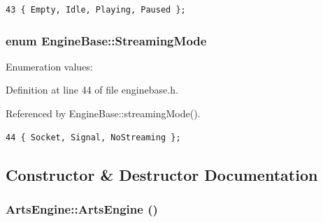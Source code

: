 \footnotesize\begin{verbatim}43 { Empty, Idle, Playing, Paused };
\end{verbatim}\normalsize 
{}
\subsubsection{\setlength{\rightskip}{0pt plus 5cm}enum {\bf Engine\-Base::Streaming\-Mode}\hspace{0.3cm}{\tt  [inherited]}}\label{classEngineBase_EngineBasew8}


\begin{Desc}
\item[Enumeration values: ]\par
\begin{description}
\item[{\em 
Socket\label{classEngineBase_EngineBasew8EngineBasew4}
}]\item[{\em 
Signal\label{classEngineBase_EngineBasew8EngineBasew5}
}]\item[{\em 
No\-Streaming\label{classEngineBase_EngineBasew8EngineBasew6}
}]\end{description}
\end{Desc}



Definition at line 44 of file enginebase.h.

Referenced by Engine\-Base::streaming\-Mode().



\footnotesize\begin{verbatim}44 { Socket, Signal, NoStreaming };
\end{verbatim}\normalsize 


\subsection{Constructor \& Destructor Documentation}
\subsubsection{\setlength{\rightskip}{0pt plus 5cm}Arts\-Engine::Arts\-Engine ()}\label{classArtsEngine_ArtsEnginea0}




